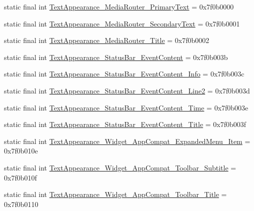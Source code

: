 \begin{CompactItemize}
static final int \hyperlink{classandroid_1_1support_1_1graphics_1_1drawable_1_1_r_1_1style_d4b8880ac628aa4918dc79b43d42e05d}{TextAppearance\_\-MediaRouter\_\-PrimaryText} = 0x7f0b0000
\item 
static final int \hyperlink{classandroid_1_1support_1_1graphics_1_1drawable_1_1_r_1_1style_5d4784754a4fa772adb84325e23fda9b}{TextAppearance\_\-MediaRouter\_\-SecondaryText} = 0x7f0b0001
\item 
static final int \hyperlink{classandroid_1_1support_1_1graphics_1_1drawable_1_1_r_1_1style_5afdb40750a9d169e919ba73702288c8}{TextAppearance\_\-MediaRouter\_\-Title} = 0x7f0b0002
\item 
static final int \hyperlink{classandroid_1_1support_1_1graphics_1_1drawable_1_1_r_1_1style_7ace5c8886bbf1ff3cd959fdf50c89bd}{TextAppearance\_\-StatusBar\_\-EventContent} = 0x7f0b003b
\item 
static final int \hyperlink{classandroid_1_1support_1_1graphics_1_1drawable_1_1_r_1_1style_65a3ee70d251188297b2f75bb32d84ce}{TextAppearance\_\-StatusBar\_\-EventContent\_\-Info} = 0x7f0b003c
\item 
static final int \hyperlink{classandroid_1_1support_1_1graphics_1_1drawable_1_1_r_1_1style_4ddb4e9f9c8b14e54bd21b8d0f916718}{TextAppearance\_\-StatusBar\_\-EventContent\_\-Line2} = 0x7f0b003d
\item 
static final int \hyperlink{classandroid_1_1support_1_1graphics_1_1drawable_1_1_r_1_1style_b117b7c8350c4b9ed1c73e560bd63613}{TextAppearance\_\-StatusBar\_\-EventContent\_\-Time} = 0x7f0b003e
\item 
static final int \hyperlink{classandroid_1_1support_1_1graphics_1_1drawable_1_1_r_1_1style_91c5d1b64ec16a5b0069ae3164d924c4}{TextAppearance\_\-StatusBar\_\-EventContent\_\-Title} = 0x7f0b003f
\item 
static final int \hyperlink{classandroid_1_1support_1_1graphics_1_1drawable_1_1_r_1_1style_6efd7a6b9e1fd87e5d42acda0f8cc423}{TextAppearance\_\-Widget\_\-AppCompat\_\-ExpandedMenu\_\-Item} = 0x7f0b010e
\item 
static final int \hyperlink{classandroid_1_1support_1_1graphics_1_1drawable_1_1_r_1_1style_78999cd6d13284a6747c9dd2d96ab1c1}{TextAppearance\_\-Widget\_\-AppCompat\_\-Toolbar\_\-Subtitle} = 0x7f0b010f
\item 
static final int \hyperlink{classandroid_1_1support_1_1graphics_1_1drawable_1_1_r_1_1style_3bf11c1c68c725b9de2d5a8183ea03e8}{TextAppearance\_\-Widget\_\-AppCompat\_\-Toolbar\_\-Title} = 0x7f0b0110
\item 

\end{CompactItemize}
